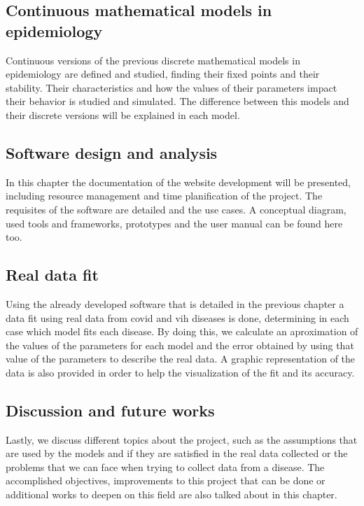 \subsection*{Continuous mathematical models in epidemiology}

Continuous versions of the previous discrete mathematical models in epidemiology are defined and studied, finding their fixed points and their stability. Their characteristics and how the values of their parameters impact their behavior is studied and simulated. The difference between this models and their discrete versions will be explained in each model.

\subsection*{Software design and analysis}

In this chapter the documentation of the website development will be presented, including resource management and time planification of the project. The requisites of the software are detailed and the use cases. A conceptual diagram, used tools and frameworks, prototypes and the user manual can be found here too.

\subsection*{Real data fit}

Using the already developed software that is detailed in the previous chapter a data fit using real data from covid and vih diseases is done, determining in each case which model fits each disease. By doing this, we calculate an aproximation of the values of the parameters for each model and the error obtained by using that value of the parameters to describe the real data. A graphic representation of the data is also provided in order to help the visualization of the fit and its accuracy.

\subsection*{Discussion and future works}

Lastly, we discuss different topics about the project, such as the assumptions that are used by the models and if they are satisfied in the real data collected or the problems that we can face when trying to collect data from a disease. The accomplished objectives, improvements to this project that can be done or additional works to deepen on this field are also talked about in this chapter.